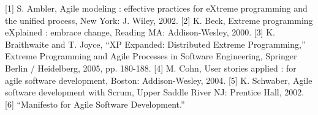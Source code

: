 [1] S. Ambler, Agile modeling : effective practices for eXtreme programming and the unified process,  New York: J. Wiley, 2002.
[2] K. Beck, Extreme programming eXplained : embrace change,  Reading  MA: Addison-Wesley, 2000.
[3] K. Braithwaite and T. Joyce, “XP Expanded: Distributed Extreme Programming,” Extreme Programming and Agile Processes in Software Engineering, Springer Berlin / Heidelberg, 2005, pp. 180-188.
[4] M. Cohn, User stories applied : for agile software development,  Boston: Addison-Wesley, 2004.
[5] K. Schwaber, Agile software development with Scrum,  Upper Saddle River  NJ: Prentice Hall, 2002.
[6] “Manifesto for Agile Software Development.”

